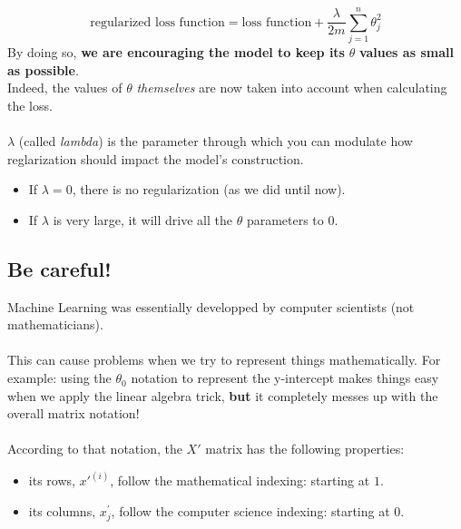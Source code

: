 $$
\text{regularized loss function} = \text{loss function} + \frac{\lambda}{2m} \sum_{j = 1}^n \theta_j^2
$$
By doing so, \textbf{we are encouraging the model to keep its} $\theta$ 
\textbf{values as small as possible}.\\
Indeed, the values of $\theta$ \textit{themselves} are now taken 
into account when calculating the loss.\\
\\
$\lambda$ (called \textit{lambda}) is the parameter through which you can modulate how 
reglarization should impact the model's construction.
\begin{itemize}
    \item If $\lambda = 0$, there is no regularization (as we did until now).
    \item If $\lambda$ is very large, it will drive all the $\theta$ parameters to $0$.
\end{itemize}


\subsection*{Be careful!}
Machine Learning was essentially developped by computer scientists (not mathematicians).\\
\\
This can cause problems when we try to represent things mathematically.
For example: using the $\theta_0$ notation to represent the y-intercept makes things easy 
when we apply the linear algebra trick, \textbf{but} it completely messes up with the overall
 matrix notation!\\
\\
According to that notation, the $X'$ matrix has the following properties: 
\begin{itemize}
    \item its rows, $x'^{(i)}$, follow the mathematical indexing: starting at $1$.
    \item its columns, $x^{'}_j$, follow the computer science indexing: starting at $0$.
\end{itemize}

